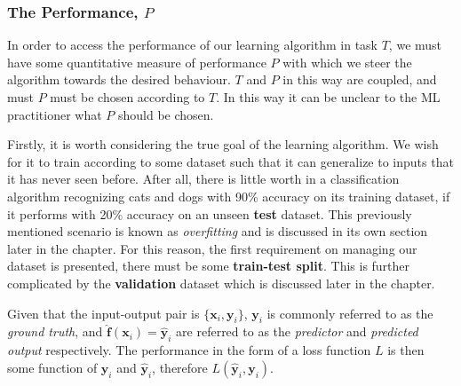 

\subsubsection{The Performance, $P$\label{sec:ML-performance}}
In order to access the performance of our learning algorithm in task $T$,
we must have some quantitative measure of performance $P$ with which we steer
the algorithm towards the desired behaviour. $T$ and $P$ in this way are
coupled, and must $P$ must be chosen according to $T$. In this way it can be
unclear to the \gls{ML} practitioner what $P$ should be chosen.

Firstly, it is worth considering the true goal of the learning algorithm. We
wish for it to train according to some dataset such that it can generalize to
inputs that it has never seen before. After all, there is little worth in a
classification algorithm recognizing cats and dogs with 90\% accuracy on its
training dataset, if it performs with 20\% accuracy on an unseen \textbf{test}
dataset. This previously mentioned scenario is known as \textit{overfitting} and
is discussed in its own section later in the chapter. For this reason, the first
requirement on managing our dataset is presented, there must be some
\textbf{train-test split}. This is further complicated by the
\textbf{validation} dataset which is discussed later in the chapter.

Given that the input-output pair is $\{\mathbf{x}_i, \mathbf{y}_i\}$,
$\mathbf{y}_i$ is commonly referred to as the \textit{ground truth}, and
$\hat{\mathbf{f}}(\mathbf{x}_i)=\hat{\mathbf{y}}_i$ are referred to as the
\textit{predictor} and \textit{predicted output} respectively. The performance
in the form of a loss function $L$ is then some function of $\mathbf{y}_i$ and
$\hat{\mathbf{y}}_i$, therefore $L(\hat{\mathbf{y}}_i, \mathbf{y}_i)$.

